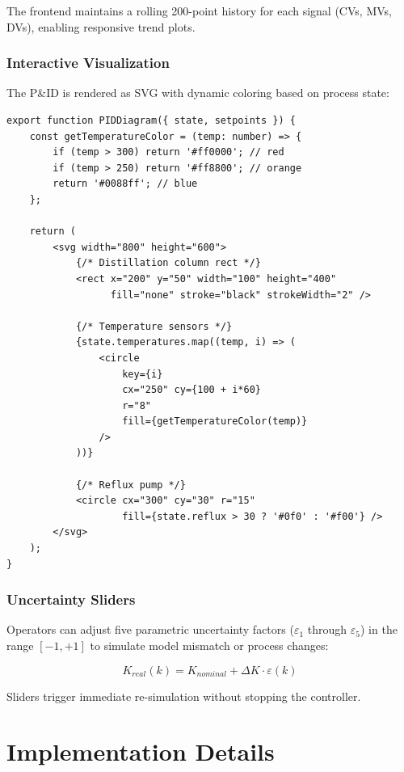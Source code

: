 \documentclass[conference]{IEEEtran}
\begin{document}
The frontend maintains a rolling 200-point history for each signal (CVs, MVs, DVs), enabling responsive trend plots.

\subsubsection{Interactive Visualization}

The P\&ID is rendered as SVG with dynamic coloring based on process state:

\begin{lstlisting}[caption=P\&ID Rendering (React)]
export function PIDDiagram({ state, setpoints }) {
    const getTemperatureColor = (temp: number) => {
        if (temp > 300) return '#ff0000'; // red
        if (temp > 250) return '#ff8800'; // orange
        return '#0088ff'; // blue
    };

    return (
        <svg width="800" height="600">
            {/* Distillation column rect */}
            <rect x="200" y="50" width="100" height="400"
                  fill="none" stroke="black" strokeWidth="2" />

            {/* Temperature sensors */}
            {state.temperatures.map((temp, i) => (
                <circle
                    key={i}
                    cx="250" cy={100 + i*60}
                    r="8"
                    fill={getTemperatureColor(temp)}
                />
            ))}

            {/* Reflux pump */}
            <circle cx="300" cy="30" r="15"
                    fill={state.reflux > 30 ? '#0f0' : '#f00'} />
        </svg>
    );
}
\end{lstlisting}

\subsubsection{Uncertainty Sliders}

Operators can adjust five parametric uncertainty factors ($\varepsilon_1$ through $\varepsilon_5$) in the range $[-1, +1]$ to simulate model mismatch or process changes:

\begin{equation}
K_{real}(k) = K_{nominal} + \Delta K \cdot \varepsilon(k)
\end{equation}

Sliders trigger immediate re-simulation without stopping the controller.

\section{Implementation Details}
\end{document}
